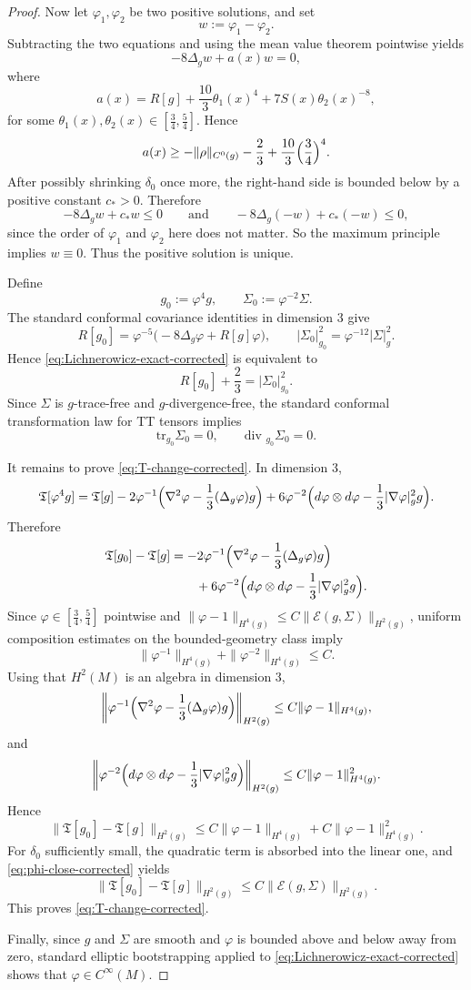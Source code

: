 \documentclass[10pt,a4paper]{amsart}
\newcommand{\tr}{\text{tr}}
\renewcommand{\div}{\mbox{div }}
\begin{document}
\begin{proof}
\noindent  Now let \(\varphi_{1},\varphi_{2}\) be two positive solutions, and set
\[
w:=\varphi_{1}-\varphi_{2}.
\]
Subtracting the two equations and using the mean value theorem pointwise yields
\[
-8\Delta_{g}w + a(x)w=0,
\]
where
\[
a(x)
=
R[g]
+
\frac{10}{3}\theta_{1}(x)^{4}
+
7S(x)\theta_{2}(x)^{-8},
\]
for some \(\theta_{1}(x),\theta_{2}(x)\in[\frac34,\frac54]\). Hence
\[
a(x)\ge -\|\rho\|_{C^{0}(g)}-\frac23+\frac{10}{3}\Bigl(\frac34\Bigr)^{4}.
\]
After possibly shrinking \(\delta_{0}\) once more, the right-hand side is bounded below by
a positive constant \(c_{*}>0\). Therefore
\[
-8\Delta_{g}w+c_{*}w\le 0
\qquad\text{and}\qquad
-8\Delta_{g}(-w)+c_{*}(-w)\le 0,
\]
since the order of $\varphi_{1}$ and $\varphi_{2}$ here does not matter.
So the maximum principle implies \(w\equiv0\). Thus the positive solution is unique.

\noindent Define
\[
g_{0}:=\varphi^{4}g,\qquad \Sigma_{0}:=\varphi^{-2}\Sigma.
\]
The standard conformal covariance identities in dimension \(3\) give
\[
R[g_{0}]
=
\varphi^{-5}\bigl(-8\Delta_{g}\varphi+R[g]\varphi\bigr),
\qquad
|\Sigma_{0}|_{g_{0}}^{2}
=
\varphi^{-12}|\Sigma|_{g}^{2}.
\]
Hence \eqref{eq:Lichnerowicz-exact-corrected} is equivalent to
\[
R[g_{0}]+\frac23=|\Sigma_{0}|_{g_{0}}^{2}.
\]
Since \(\Sigma\) is \(g\)-trace-free and \(g\)-divergence-free, the standard conformal
transformation law for TT tensors implies
\[
\tr_{g_{0}}\Sigma_{0}=0,
\qquad
\div_{g_{0}}\Sigma_{0}=0.
\]

\noindent It remains to prove \eqref{eq:T-change-corrected}. In dimension \(3\),
\[
\mathfrak T[\varphi^{4}g]
=
\mathfrak T[g]
-
2\varphi^{-1}\Bigl(\nabla^{2}\varphi-\frac13(\Delta_{g}\varphi)g\Bigr)
+
6\varphi^{-2}\Bigl(d\varphi\otimes d\varphi-\frac13|\nabla\varphi|_{g}^{2}g\Bigr).
\]
Therefore
\begin{align*}
\mathfrak T[g_{0}]-\mathfrak T[g]
&=
-2\varphi^{-1}\Bigl(\nabla^{2}\varphi-\frac13(\Delta_{g}\varphi)g\Bigr)\\
&\qquad
+
6\varphi^{-2}\Bigl(d\varphi\otimes d\varphi-\frac13|\nabla\varphi|_{g}^{2}g\Bigr).
\end{align*}
Since \(\varphi\in[\frac34,\frac54]\) pointwise and
\(\|\varphi-1\|_{H^{4}(g)}\le C\|\mathcal E(g,\Sigma)\|_{H^{2}(g)}\), uniform composition
estimates on the bounded-geometry class imply
\[
\|\varphi^{-1}\|_{H^{4}(g)}+\|\varphi^{-2}\|_{H^{4}(g)}\le C.
\]
Using that \(H^{2}(M)\) is an algebra in dimension \(3\),
\[
\left\|
\varphi^{-1}\Bigl(\nabla^{2}\varphi-\frac13(\Delta_{g}\varphi)g\Bigr)
\right\|_{H^{2}(g)}
\le
C\|\varphi-1\|_{H^{4}(g)},
\]
and
\[
\left\|
\varphi^{-2}\Bigl(d\varphi\otimes d\varphi-\frac13|\nabla\varphi|_{g}^{2}g\Bigr)
\right\|_{H^{2}(g)}
\le
C\|\varphi-1\|_{H^{4}(g)}^{2}.
\]
Hence
\[
\|\mathfrak T[g_{0}]-\mathfrak T[g]\|_{H^{2}(g)}
\le
C\|\varphi-1\|_{H^{4}(g)}
+
C\|\varphi-1\|_{H^{4}(g)}^{2}.
\]
For \(\delta_{0}\) sufficiently small, the quadratic term is absorbed into the linear one,
and \eqref{eq:phi-close-corrected} yields
\[
\|\mathfrak T[g_{0}]-\mathfrak T[g]\|_{H^{2}(g)}
\le
C\|\mathcal E(g,\Sigma)\|_{H^{2}(g)}.
\]
This proves \eqref{eq:T-change-corrected}.

\noindent Finally, since \(g\) and \(\Sigma\) are smooth and \(\varphi\) is bounded above and below
away from zero, standard elliptic bootstrapping applied to
\eqref{eq:Lichnerowicz-exact-corrected} shows that \(\varphi\in C^{\infty}(M)\).
\end{proof}
\end{document}
